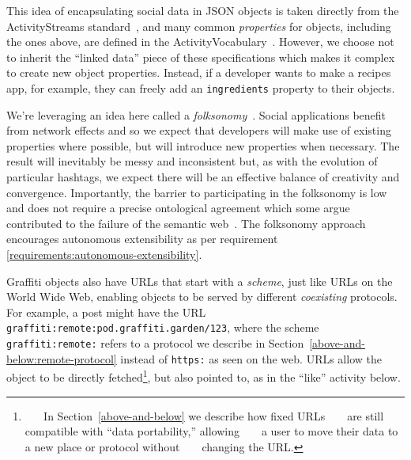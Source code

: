 This idea of encapsulating social data in JSON objects is
taken directly from the ActivityStreams standard~\cite{activitystreams},
and many common \emph{properties} for objects,
including the ones above, are defined in the
ActivityVocabulary~\cite{activityvocab}.
However, we choose not to inherit the ``linked data'' piece
of these specifications which makes it complex to create new object properties.
Instead, if a developer wants to make a recipes app, for example,
they can freely add an \texttt{ingredients} property to their objects.

We're leveraging an idea here called a \emph{folksonomy}~\cite{folksonomy}.
Social applications
benefit from network effects and so we expect that developers will make use of
existing properties where possible,
but will introduce new properties when necessary.
The result will inevitably be messy and inconsistent but, as with the evolution of
particular hashtags, we expect there will be an effective balance of creativity and convergence.
Importantly, the barrier to participating in the folksonomy is low
and does not require a precise ontological agreement
which some argue contributed to the failure of the semantic
web~\cite{semanticwebtwodecades}.
The folksonomy approach encourages autonomous extensibility
as per requirement \ref{requirements:autonomous-extensibility}.


Graffiti objects also have URLs that
start with a \emph{scheme}, just like URLs on the World Wide Web,
enabling objects to be served by different \emph{coexisting} protocols.
For example, a post might have the URL
\texttt{graffiti\allowbreak:remote\allowbreak:pod\allowbreak.graffiti\allowbreak.garden\allowbreak/123},
where the scheme \texttt{graffiti:remote:} refers to a protocol we describe
in Section~\ref{above-and-below:remote-protocol}
instead of \texttt{https:} as seen on the web.
URLs allow the object to be directly fetched\footnote{
    In Section~\ref{above-and-below} we describe how fixed URLs
    are still compatible with ``data portability,'' allowing
    a user to move their data to a new place or protocol without
    changing the URL.
}, but also pointed to, as in the
``like'' activity below.

